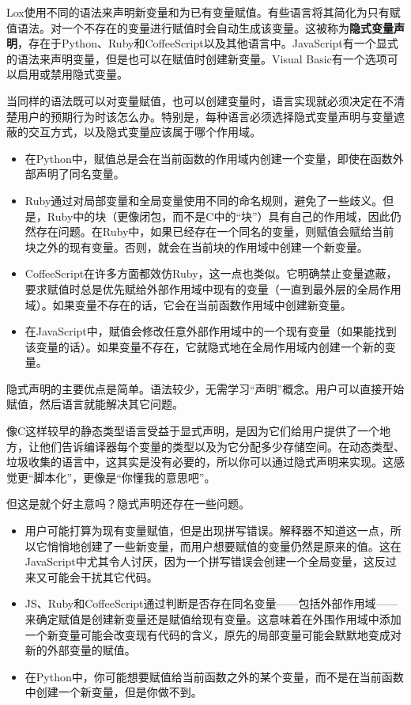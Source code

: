 \documentclass[cn,11pt,chinese]{elegantbook}
\begin{document}
Lox使用不同的语法来声明新变量和为已有变量赋值。有些语言将其简化为只有赋值语法。对一个不存在的变量进行赋值时会自动生成该变量。这被称为\textbf{隐式变量声明}，存在于Python、Ruby和CoffeeScript以及其他语言中。JavaScript有一个显式的语法来声明变量，但是也可以在赋值时创建新变量。Visual Basic有一个选项可以启用或禁用隐式变量。

当同样的语法既可以对变量赋值，也可以创建变量时，语言实现就必须决定在不清楚用户的预期行为时该怎么办。特别是，每种语言必须选择隐式变量声明与变量遮蔽的交互方式，以及隐式变量应该属于哪个作用域。

\begin{itemize}
  \item 在Python中，赋值总是会在当前函数的作用域内创建一个变量，即使在函数外部声明了同名变量。
  \item Ruby通过对局部变量和全局变量使用不同的命名规则，避免了一些歧义。但是，Ruby中的块（更像闭包，而不是C中的“块”）具有自己的作用域，因此仍然存在问题。在Ruby中，如果已经存在一个同名的变量，则赋值会赋给当前块之外的现有变量。否则，就会在当前块的作用域中创建一个新变量。
  \item CoffeeScript在许多方面都效仿Ruby，这一点也类似。它明确禁止变量遮蔽，要求赋值时总是优先赋给外部作用域中现有的变量（一直到最外层的全局作用域）。如果变量不存在的话，它会在当前函数作用域中创建新变量。
  \item 在JavaScript中，赋值会修改任意外部作用域中的一个现有变量（如果能找到该变量的话）。如果变量不存在，它就隐式地在全局作用域内创建一个新的变量。
\end{itemize}

隐式声明的主要优点是简单。语法较少，无需学习“声明”概念。用户可以直接开始赋值，然后语言就能解决其它问题。

像C这样较早的静态类型语言受益于显式声明，是因为它们给用户提供了一个地方，让他们告诉编译器每个变量的类型以及为它分配多少存储空间。在动态类型、垃圾收集的语言中，这其实是没有必要的，所以你可以通过隐式声明来实现。这感觉更“脚本化”，更像是“你懂我的意思吧”。

但这是就个好主意吗？隐式声明还存在一些问题。

\begin{itemize}
  \item 用户可能打算为现有变量赋值，但是出现拼写错误。解释器不知道这一点，所以它悄悄地创建了一些新变量，而用户想要赋值的变量仍然是原来的值。这在JavaScript中尤其令人讨厌，因为一个拼写错误会创建一个全局变量，这反过来又可能会干扰其它代码。
  \item JS、Ruby和CoffeeScript通过判断是否存在同名变量——包括外部作用域——来确定赋值是创建新变量还是赋值给现有变量。这意味着在外围作用域中添加一个新变量可能会改变现有代码的含义，原先的局部变量可能会默默地变成对新的外部变量的赋值。
  \item 在Python中，你可能想要赋值给当前函数之外的某个变量，而不是在当前函数中创建一个新变量，但是你做不到。
\end{itemize}
\end{document}
